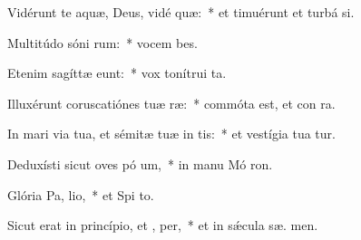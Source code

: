 \item Vidérunt te aquæ, Deus, vidé  quæ:~* et timuérunt et turbá  si.
\item Multitúdo sóni rum:~* vocem  bes.
\item Etenim sagíttæ  eunt:~* vox tonítrui   ta.
\item Illuxérunt coruscatiónes tuæ  ræ:~* commóta est, et con ra.
\item In mari via tua, et sémitæ tuæ in  tis:~* et vestígia tua  tur.
\item Deduxísti sicut oves pó um,~* in manu Mó  ron.
\item Glória Pa,  lio,~* et Spi to.
\item Sicut erat in princípio, et ,  per,~* et in sǽcula sæ. men.
